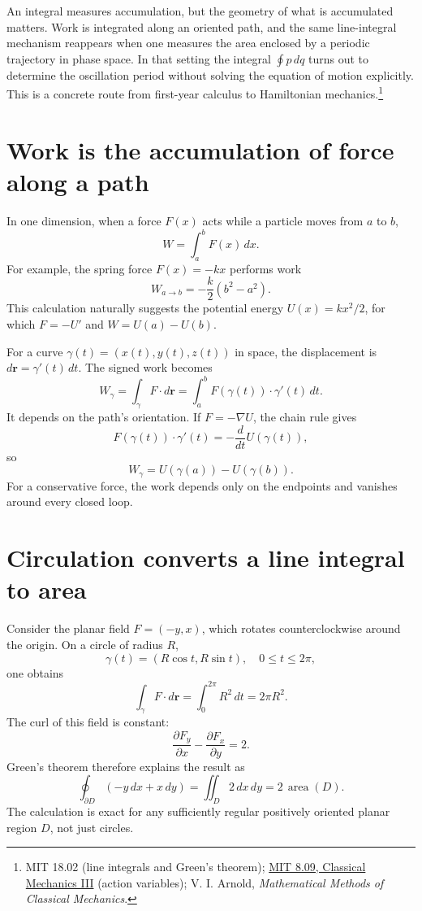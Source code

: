 
An integral measures accumulation, but the geometry of what is accumulated matters. Work is integrated along an oriented path, and the same line-integral mechanism reappears when one measures the area enclosed by a periodic trajectory in phase space. In that setting the integral \(\oint p\,dq\) turns out to determine the oscillation period without solving the equation of motion explicitly. This is a concrete route from first-year calculus to Hamiltonian mechanics.\footnote{MIT 18.02 (line integrals and Green's theorem); \href{https://ocw.mit.edu/courses/8-09-classical-mechanics-iii-fall-2014/pages/lecture-notes/}{MIT 8.09, Classical Mechanics III} (action variables); V. I. Arnold, \emph{Mathematical Methods of Classical Mechanics}.}

\section{Work is the accumulation of force along a path}

In one dimension, when a force \(F(x)\) acts while a particle moves from \(a\) to \(b\),
\[
 W=\int_a^bF(x)\,dx.
\]
For example, the spring force \(F(x)=-kx\) performs work
\[
 W_{a\to b}=-\frac k2(b^2-a^2).
\]
This calculation naturally suggests the potential energy \(U(x)=kx^2/2\), for which \(F=-U'\) and \(W=U(a)-U(b)\).

For a curve \(\gamma(t)=(x(t),y(t),z(t))\) in space, the displacement is \(d\mathbf r=\gamma'(t)\,dt\). The signed work becomes
\[
 \boxed{W_\gamma=\int_\gamma F\cdot d\mathbf r
 =\int_a^bF(\gamma(t))\cdot\gamma'(t)\,dt.}
\]
It depends on the path's orientation. If \(F=-\nabla U\), the chain rule gives
\[
 F(\gamma(t))\cdot\gamma'(t)
 =-\frac d{dt}U(\gamma(t)),
\]
so
\[
 \boxed{W_\gamma=U(\gamma(a))-U(\gamma(b)).}
\]
For a conservative force, the work depends only on the endpoints and vanishes around every closed loop.

\section{Circulation converts a line integral to area}

Consider the planar field \(F=(-y,x)\), which rotates counterclockwise around the origin. On a circle of radius \(R\),
\[
 \gamma(t)=(R\cos t,R\sin t),\quad0\le t\le2\pi,
\]
one obtains
\[
 \int_\gamma F\cdot d\mathbf r
 =\int_0^{2\pi}R^2\,dt=2\pi R^2.
\]
The curl of this field is constant:
\[
 \frac{\partial F_y}{\partial x}
 -\frac{\partial F_x}{\partial y}=2.
\]
Green's theorem therefore explains the result as
\[
 \oint_{\partial D}(-y\,dx+x\,dy)
 =\iint_D2\,dx\,dy=2\,\operatorname{area}(D).
\]
The calculation is exact for any sufficiently regular positively oriented planar region \(D\), not just circles.


